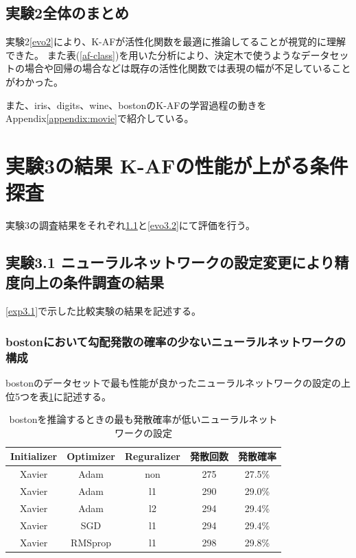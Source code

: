 \subsection{実験2全体のまとめ}
実験2\ref{evo2}により、K-AFが活性化関数を最適に推論してることが視覚的に理解できた。
また表(\ref{af-class})を用いた分析により、決定木で使うようなデータセットの場合や回帰の場合などは既存の活性化関数では表現の幅が不足していることがわかった。

また、iris、digits、wine、bostonのK-AFの学習過程の動きをAppendix\ref{appendix:movie}で紹介している。









\section{実験3の結果 K-AFの性能が上がる条件探査}
\label{evo3}
実験3の調査結果をそれぞれ\ref{evo3.1}と\ref{evo3.2}にて評価を行う。


\subsection{実験3.1 ニューラルネットワークの設定変更により精度向上の条件調査の結果}
\label{evo3.1}
\ref{exp3.1}で示した比較実験の結果を記述する。


\subsubsection{bostonにおいて勾配発散の確率の少ないニューラルネットワークの構成}
bostonのデータセットで最も性能が良かったニューラルネットワークの設定の上位5つを表\ref{bostonbest}に記述する。


\begin{table}[htbp]
    \begin{center}
        \caption{bostonを推論するときの最も発散確率が低いニューラルネットワークの設定}
        \label{bostonbest}
        \vspace{2mm} 
        \begin{tabular}{ |c|c|c|c|c| }
        Initializer & Optimizer &  Reguralizer & 発散回数 & 発散確率 \\
        \hline
        Xavier & Adam & non & 275 & 27.5\%　\\
        \hline
        Xavier & Adam & l1 & 290 & 29.0\%　\\
        \hline
        Xavier & Adam & l2 & 294 & 29.4\%　\\
        \hline
        Xavier & SGD & l1 & 294 & 29.4\%　\\
        \hline
        Xavier & RMSprop & l1 & 298 & 29.8\%　\\
        \hline
        \end{tabular}
    \end{center}
\end{table}


